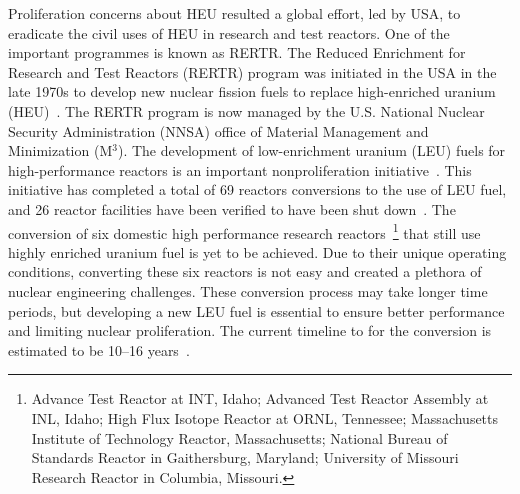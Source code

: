 Proliferation concerns about HEU resulted a global effort, led by USA, to eradicate the civil uses of HEU in research and test reactors. One of the important programmes is known as RERTR.
The Reduced Enrichment for Research and Test Reactors (RERTR) program was initiated in the USA in the late 1970s to develop new nuclear fission fuels to replace high-enriched uranium (HEU)~\cite{travelli1980current,snelgrove1997development}\@.  The RERTR program is now managed by the U.S. National Nuclear Security Administration (NNSA) office of Material Management and Minimization (M$^3$). The development of low-enrichment uranium (LEU) fuels for high-performance reactors is an important nonproliferation initiative~\cite{m3web}.
This initiative has completed a total of 69 reactors conversions to the use of LEU fuel, and 26 reactor facilities have been verified to have been shut down~\cite{wilson2017us}. The conversion of six domestic high performance research reactors~\footnote{Advance Test Reactor at INT, Idaho; Advanced Test Reactor Assembly at INL, Idaho; High Flux Isotope Reactor at ORNL, Tennessee; Massachusetts Institute of Technology Reactor, Massachusetts; National Bureau of Standards Reactor in Gaithersburg, Maryland; University of Missouri Research Reactor in Columbia, Missouri.} that still use highly enriched uranium fuel is yet to be achieved. Due to their unique operating conditions, converting these six reactors is not easy and created a plethora of nuclear engineering challenges. These conversion process may take longer time periods, but developing a new LEU fuel is essential to ensure better performance and limiting nuclear proliferation. The current timeline to for the conversion is estimated to be 10--16 years~\cite{national2016reducing, national2012progress}. 



